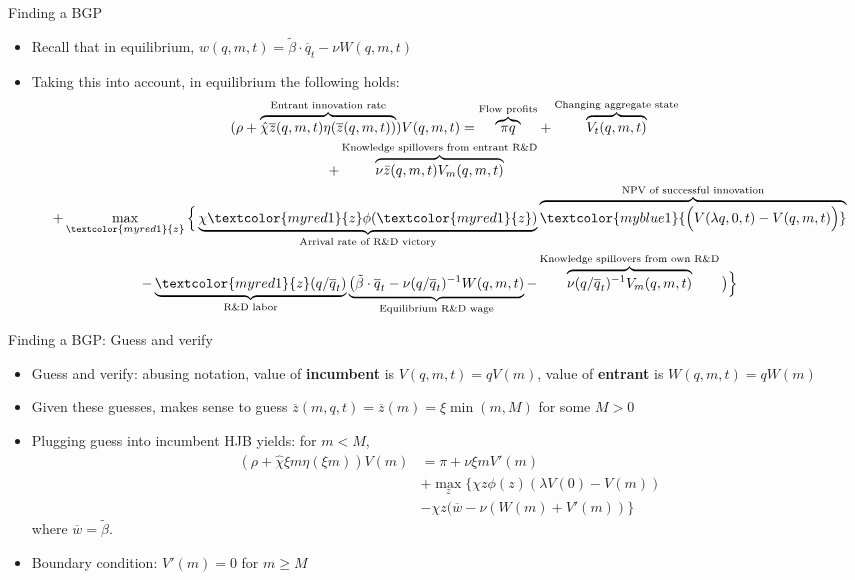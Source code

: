 \documentclass[english,usenames,dvipsnames]{beamer}
\begin{document}
\begin{frame}{Finding a BGP}
\begin{itemize}
	\item Recall that in equilibrium, $w(q,m,t) = \tilde{\beta}\cdot\overline{q}_t - \nu W(q,m,t)$
	\item Taking this into account, in equilibrium the following holds: 
	\footnotesize
	\begin{align*}
	(\rho + \overbrace{\hat{\chi} \overline{z}(q,m,t)\eta(\overline{z}(q,m,t))}^{\text{Entrant innovation rate}}) V(q,m,t) = \overbrace{\pi q}^{\text{Flow profits}} &+ \overbrace{V_t(q,m,t)}^{\text{Changing aggregate state}} \\ 
	+  \overbrace{\nu \bar{z}(q,m,t) V_m(q,m,t)}^{\text{Knowledge spillovers from entrant R\&D}}  &\\
	+ \max_{\textcolor{myred1}{z}} \Big\{\underbrace{\chi \textcolor{myred1}{z}\phi(\textcolor{myred1}{z})}_{\text{Arrival rate of R\&D victory}} &\overbrace{\textcolor{myblue1}{\Big(V(\lambda q,0,t)-V(q,m,t)\Big)}}^{\text{NPV of successful innovation}} \\
	-\underbrace{\textcolor{myred1}{z}(q/\overline{q}_t)}_{\text{R\&D labor}} \underbrace{\big(\tilde{\beta}\cdot\overline{q}_t - \nu (q/\overline{q}_t)^{-1}W(q,m,t)}_{\text{Equilibrium R\&D wage}} - & \overbrace{\nu (q/\overline{q}_t)^{-1} V_m(q,m,t)}^{\text{Knowledge spillovers from own R\&D}}\big)\Big \} 
	\end{align*}
\end{itemize}
\end{frame}

\begin{frame}{Finding a BGP: Guess and verify}
\begin{itemize}
	\item Guess and verify: abusing notation, value of \textbf{incumbent} is $V(q,m,t) = qV(m)$, value of \textbf{entrant} is $W(q,m,t) = qW(m)$
	\item Given these guesses, makes sense to guess $\overline{z}(m,q,t) = \overline{z}(m) = \xi \min(m,M)$ for some $M > 0$
	\item Plugging guess into incumbent HJB yields: for $m < M$,
	\begin{align*}
	(\rho + \hat{\chi}\xi m \eta(\xi m) ) V(m) &= \pi + \nu \xi m V'(m) \\
	&+ \max_{z} \Big\{ \chi z \phi(z) (\lambda V(0) - V(m))   \\
	&- \chi z (\overline{w} - \nu (W(m) + V'(m)) \Big\}
	\end{align*}
	where $\overline{w} = \tilde{\beta}$. 
	\item Boundary condition: $V'(m) = 0$ for $m \ge M$
\end{itemize}
\end{frame}
\end{document}
